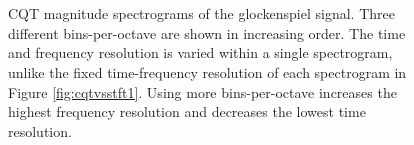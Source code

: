 \documentclass[report.tex]{subfiles}
\begin{document}
\begin{figure}[ht]
	\centering
	\\
	\vspace{-0.35em}
	\\
	\vspace{-0.35em}
	\vspace{-0.35em}
	\caption{CQT magnitude spectrograms of the glockenspiel signal. Three different bins-per-octave are shown in increasing order. The time and frequency resolution is varied within a single spectrogram, unlike the fixed time-frequency resolution of each spectrogram in Figure \ref{fig:cqtvsstft1}. Using more bins-per-octave increases the highest frequency resolution and decreases the lowest time resolution.}
	\label{fig:cqtvsstft2}
\end{figure}
\end{document}
